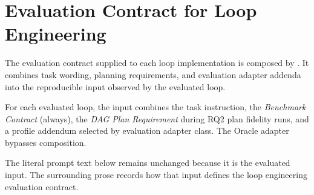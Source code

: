 \section{Evaluation Contract for Loop Engineering}\label{app:prompts}

The evaluation contract supplied to each loop implementation is composed by . It combines task wording, planning requirements, and evaluation adapter addenda into the reproducible input observed by the evaluated loop.

For each evaluated loop, the input combines the task instruction, the \emph{Benchmark Contract} (always), the \emph{DAG Plan Requirement} during RQ2 plan fidelity runs, and a profile addendum selected by evaluation adapter class. The Oracle adapter bypasses composition.

The literal prompt text below remains unchanged because it is the evaluated input. The surrounding prose records how that input defines the loop engineering evaluation contract.

